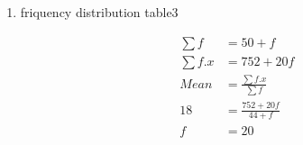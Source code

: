\renewcommand{\theequation}{\theenumi}
\begin{enumerate}[label=\arabic*.,ref=\thesubsection.\theenumi]
\item \begin{table}[!ht]
	\centering
	
	\caption{friquency distribution table3 }
\end{table}
	
\begin{align}
\sum{f} &= 50 +f
\\
\sum{f.x} &= 752 + 20f
\\
Mean &= \frac{\sum{f.x}}{\sum{f}}
\\18 &= \frac{752+20f}{44 +f}
\\f&= 20
\end{align}
\end{enumerate}
